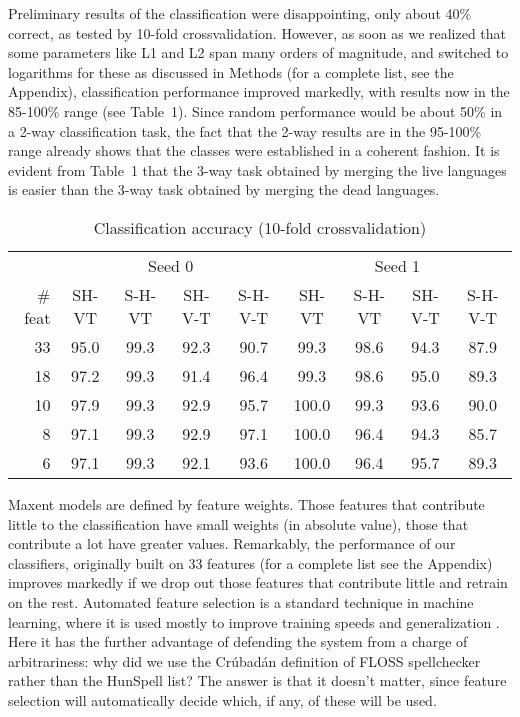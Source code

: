 \documentclass[10pt]{article}
\begin{document}
Preliminary results of the classification were disappointing, only about 40\%
correct, as tested by 10-fold crossvalidation. However, as soon as we realized
that some parameters like L1 and L2 span many orders of magnitude, and
switched to logarithms for these {\color{black} as discussed in Methods (for a
  complete list, see the Appendix)}, classification performance improved
markedly, with results now in the 85-100\% range (see Table~1). Since random
performance would be about 50\% in a 2-way classification task, the fact that
the 2-way results are in the 95-100\% range already shows that the classes
were established in a coherent fashion.  It is evident from Table~1 that the
3-way task obtained by merging the live languages is easier than the 3-way
task obtained by merging the dead languages.

\begin{table}
\caption{Classification accuracy (10-fold crossvalidation)}
\begin{center}
\begin{tabular}{r|cccc||cccc|}
& \multicolumn{4}{c}{Seed 0} & \multicolumn{4}{c}{Seed 1}\\
\# feat & SH-VT & S-H-VT & SH-V-T & S-H-V-T &  SH-VT & S-H-VT & SH-V-T & S-H-V-T \\\hline
33	&	95.0	&	99.3	&	92.3	&	90.7	&	99.3	&	98.6	&	94.3	&	87.9\\
18	&	97.2	&	99.3	&	91.4	&	96.4	&	99.3	&	98.6	&	95.0	&	89.3\\
10	&	97.9	&	99.3	&	92.9	&	95.7	&	100.0	&	99.3	&	93.6	&	90.0\\
8	&	97.1	&	99.3	&	92.9	&	97.1	&	100.0	&	96.4	&	94.3	&	85.7\\
6	&	97.1	&	99.3	&	92.1	&	93.6	&	100.0	&	96.4	&	95.7	&	89.3\\
\end{tabular}
\end{center}
\end{table}

Maxent models are defined by feature weights. Those features that contribute
little to the classification have small weights (in absolute value), those
that contribute a lot have greater values. Remarkably, the performance of our
classifiers, originally built on 33 features (for a complete list see the
Appendix) improves markedly if we drop out those features that contribute
little and retrain on the rest. {\color{black} Automated feature selection is a
  standard technique in machine learning, where it is used mostly to improve
  training speeds and generalization \cite{Pajkossy:2013}. Here it has the
  further advantage of defending the system from a charge of arbitrariness:
  why did we use the Cr\'ubad\'an definition of FLOSS spellchecker rather than
  the HunSpell list? The answer is that it doesn't matter, since feature
  selection will automatically decide which, if any, of these will be used.}
\end{document}
